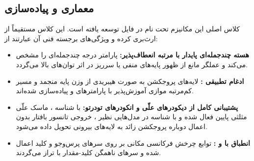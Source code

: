 \subsection{معماری و پیاده‌سازی}
کلاس اصلی این مکانیزم تحت نام  در فایل  توسعه یافته است. این کلاس مستقیماً از  ارث‌بری کرده و ویژگی‌های برجسته فنی آن عبارتند از:
\begin{itemize}
    \item \textbf{هسته چندجمله‌ای پایدار با مرتبه انعطاف‌پذیر:} پارامتر  درجه چندجمله‌ای را مشخص می‌کند و عملگر  مانع از ظهور پایه‌های منفی یا سرریز در اثر توان‌های بالا می‌گردد.
    \item \textbf{ادغام تطبیقی :} لایه‌های پروجکشن به صورت هیبریدی از وزن پایه منجمد و مسیر کم‌مرتبه موازی آموزش‌پذیر با پارامترهای  و  پیاده‌سازی شده‌اند.
    \item \textbf{پشتیبانی کامل از دیکودرهای علّی و انکودرهای تودرتو:} با شناسه ، ماسک علّی مثلثی پایین فعال شده و با شناسه  در مدل‌هایی نظیر ، خروجی تانسور بافتار بدون اعمال دوباره پروجکشن زائد به لایه‌های بیرونی تحویل داده می‌شود.
    \item \textbf{انطباق با  و :} توابع چرخش فرکانسی مکانی بر روی سرهای پرس‌وجو و کلید اعمال شده و سرهای ناهمگن کلید-مقدار با  تراز می‌گردند.
\end{itemize}
